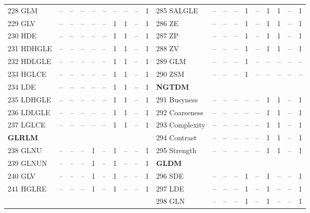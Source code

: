 \documentclass[sn-mathphys,Numbered]{sn-jnl}%
\theoremstyle{thmstyleone}%
\theoremstyle{thmstyletwo}%
\theoremstyle{thmstylethree}%
\begin{document}
\begin{table}[!hbt]
\begin{tiny}
\begin{tabular} { l  c  c  c  c  c  c  c  c  c    l  c  c  c  c  c  c  c  c  c }
 228 GLM & -- &  -- &  -- &  -- &  -- &  -- &  -- & -- & 1 &  285 SALGLE & -- &  -- &  -- &  1 &  -- &  1 &  1 & -- &  1 \\
 229 GLV & -- &  -- &  -- &  -- &  -- &  1 &  1 & -- & 1 &  286 ZE & -- &  -- &  -- &  1 &  -- &  1 &  1 & -- &  1 \\
 230 HDE & -- &  -- &  -- &  -- &  -- &  1 &  1 & -- & 1 &  287 ZP & -- &  -- &  -- &  1 &  -- &  1 &  1 & -- &  1 \\
 231 HDHGLE & -- &  -- &  -- &  -- &  -- &  1 &  1 & -- & 1 &  288 ZV & -- &  -- &  -- &  1 &  -- &  1 &  1 & -- & 1 \\
 232 HDLGLE & -- &  -- &  -- &  -- &  -- &  1 &  1 & -- & 1 &  289 GLM & -- &  -- &  -- &  1 &  -- &  -- &  -- & -- & -- \\
 233 HGLCE & -- &  -- &  -- &  -- &  -- &  1 &  1 & -- & 1 &  290 ZSM & -- &  -- &  -- &  1 &  -- &  -- &  -- & -- & -- \\
 234 LDE & -- &  -- &  -- &  -- &  -- &  1 &  1 & -- & 1 & \hspace{2mm}  \bf NGTDM \rm  &  &   &   &   &   &   &   &  &  \\
 235 LDHGLE & -- &  -- &  -- &  -- &  -- &  1 &  1 & -- & 1 &  291 Busyness & -- &  -- &  -- &  -- &  -- &  1 &  1 & -- & 1 \\
 236 LDLGLE & -- &  -- &  -- &  -- &  -- &  1 &  1 & -- & 1 &  292 Coarseness & -- &  -- &  -- &  -- &  -- &  1 &  1 & -- & 1 \\
 237 LGLCE & -- &  -- &  -- &  -- &  -- &  1 &  1 & -- & 1 &  293 Complexity & -- &  -- &  -- &  -- &  -- &  1 &  1 & -- & 1 \\
\hspace{2mm}  \bf GLRLM \rm  &  &   &   &   &   &   &   &  &   &  294 Contrast & -- &  -- &  -- &  -- &  -- &  1 &  1 & -- & 1 \\
 238 GLNU & -- &  -- &  -- &  1 &  -- &  1 &  -- & -- &  1 &  295 Strength & -- &  -- &  -- &  -- &  -- &  1 &  1 & -- & 1 \\
 239 GLNUN & -- &  -- &  -- &  1 &  -- &  1 &  -- & -- &  1 & \hspace{2mm}  \bf GLDM \rm  &  &   &   &   &   &   &   &  &  \\
 240 GLV & -- &  -- &  -- &  1 &  -- &  1 &  -- & -- &  1 &  296 SDE & -- &  -- &  -- &  1 &  -- &  1 &  -- & -- & 1 \\
 241 HGLRE & -- &  -- &  -- &  1 &  -- &  1 &  -- & -- &  1 &  297 LDE & -- &  -- &  -- &  1 &  -- &  1 &  -- & -- & 1 \\
   &  &   &   &   &   &   &   &  &   &  298 GLN & -- &  -- &  -- &  1 &  -- &  1 &  -- & -- & 1 \\

\end{tabular}
\end{tiny}
\end{table}
\end{document}
